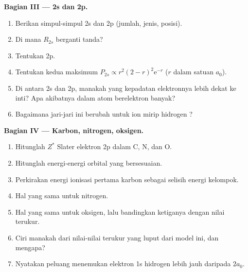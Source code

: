 \begin{problem}
\medskip
\noindent\textbf{Bagian III --- 2s dan 2p.}
\begin{enumerate}[resume]
  \item Berikan simpul-simpul 2s dan 2p (jumlah, jenis, posisi).
  \item Di mana $R_{2s}$ berganti tanda?
  \item Tentukan  2p.
  \item Tentukan kedua maksimum $P_{2s} \propto r^2(2 - r)^2\mathrm e^{-r}$
        ($r$ dalam satuan $a_0$).
  \item Di antara 2s dan 2p, manakah yang kepadatan elektronnya lebih dekat
        ke inti? Apa akibatnya dalam atom berelektron banyak?
  \item Bagaimana jari-jari ini berubah untuk ion mirip hidrogen ?
\end{enumerate}

\medskip
\noindent\textbf{Bagian IV --- Karbon, nitrogen, oksigen.}
\begin{enumerate}[resume]
  \item Hitunglah $Z^*$ Slater elektron 2p dalam C, N, dan O.
  \item Hitunglah energi-energi orbital yang bersesuaian.
  \item Perkirakan energi ionisasi pertama karbon sebagai selisih energi
        kelompok.
  \item Hal yang sama untuk nitrogen.
  \item Hal yang sama untuk oksigen, lalu bandingkan ketiganya dengan nilai
        terukur.
  \item Ciri manakah dari nilai-nilai terukur yang luput dari model ini, dan
        mengapa?
  \item Nyatakan peluang menemukan elektron 1s hidrogen lebih jauh daripada
        $2a_0$.
\end{enumerate}
\end{problem}
